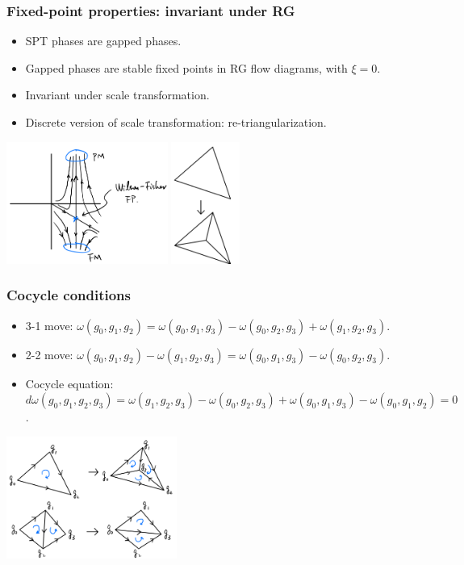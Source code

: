 \documentclass[xcolor=table, aspectratio=169,ignorenonframetext]{beamer}
\begin{document}
\begin{frame}
\frametitle{Fixed-point properties: invariant under RG}
\begin{itemize}
\item SPT phases are gapped phases.
\item Gapped phases are stable fixed points in RG flow diagrams, with $\xi=0$.
\item Invariant under scale transformation.
\item Discrete version of scale transformation: re-triangularization.
\end{itemize}

\begin{center}
	\includegraphics[height=4cm]{RGflow}
	\hspace{1cm}
	\includegraphics[height=4cm]{retri1}
\end{center}
\end{frame}

\begin{frame}
\frametitle{Cocycle conditions}
\begin{itemize}
	\item 3-1 move:
	$\omega(g_0,g_1,g_2) = \omega(g_0,g_1,g_3)
	-\omega(g_0,g_2,g_3) + \omega(g_1,g_2,g_3)$.
	\item 2-2 move:
	$\omega(g_0,g_1,g_2)-\omega(g_1, g_2,g_3)
	=\omega(g_0, g_1, g_3) - \omega(g_0, g_2, g_3)$.
	\item Cocycle equation:
	$d\omega(g_0,g_1,g_2,g_3)=\omega(g_1,g_2,g_3)
	-\omega(g_0,g_2,g_3)+\omega(g_0,g_1,g_3)-\omega(g_0,g_1,g_2)=0$.
\end{itemize}
\begin{center}
	\includegraphics[height=4cm]{moves}
\end{center}
\end{frame}
\end{document}
